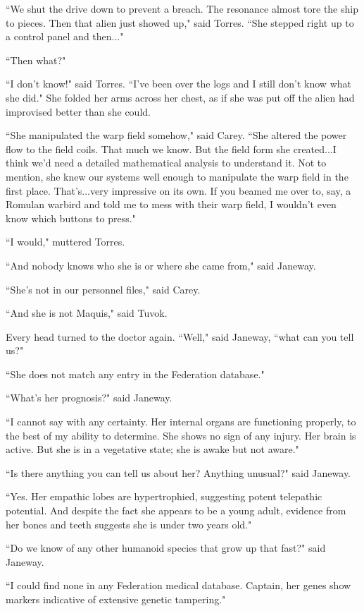 \documentclass[twoside,letterpaper,12pt]{memoir}
\begin{document}
``We shut the drive down to prevent a breach. The resonance almost tore the ship to pieces. Then that alien just showed up," said Torres. ``She stepped right up to a control panel and then..." 

``Then what?" 

``I don't know!" said Torres. ``I've been over the logs and I still don't know what she did." She folded her arms across her chest, as if she was put off the alien had improvised better than she could. 

``She manipulated the warp field somehow," said Carey. ``She altered the power flow to the field coils. That much we know. But the field form she created...I think we'd need a detailed mathematical analysis to understand it. Not to mention, she knew our systems well enough to manipulate the warp field in the first place. That's...very impressive on its own. If you beamed me over to, say, a Romulan warbird and told me to mess with their warp field, I wouldn't even know which buttons to press." 

``I would," muttered Torres. 

``And nobody knows who she is or where she came from," said Janeway. 

``She's not in our personnel files," said Carey. 

``And she is not Maquis," said Tuvok. 

Every head turned to the doctor again. ``Well," said Janeway, ``what can you tell us?" 

``She does not match any entry in the Federation database." 

``What's her prognosis?" said Janeway. 

``I cannot say with any certainty. Her internal organs are functioning properly, to the best of my ability to determine. She shows no sign of any injury. Her brain is active. But she is in a vegetative state; she is awake but not aware." 

``Is there anything you can tell us about her? Anything unusual?" said Janeway. 

``Yes. Her empathic lobes are hypertrophied, suggesting potent telepathic potential. And despite the fact she appears to be a young adult, evidence from her bones and teeth suggests she is under two years old." 

``Do we know of any other humanoid species that grow up that fast?" said Janeway. 

``I could find none in any Federation medical database. Captain, her genes show markers indicative of extensive genetic tampering." 
\end{document}
